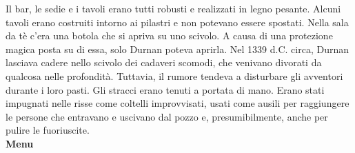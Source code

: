\documentclass{article}
\begin{document}
                    Il bar, le sedie e i tavoli erano tutti robusti e realizzati in legno pesante. Alcuni tavoli erano costruiti intorno ai pilastri e non potevano essere spostati.
                    Nella sala da tè c'era una botola che si apriva su uno scivolo. A causa di una protezione magica posta su di essa, solo Durnan poteva aprirla. Nel 1339 d.C. circa, Durnan lasciava cadere nello scivolo dei cadaveri scomodi, che venivano divorati da qualcosa nelle profondità. Tuttavia, il rumore tendeva a disturbare gli avventori durante i loro pasti.
                    Gli stracci erano tenuti a portata di mano. Erano stati impugnati nelle risse come coltelli improvvisati, usati come ausili per raggiungere le persone che entravano e uscivano dal pozzo e, presumibilmente, anche per pulire le fuoriuscite. \\
                    \textbf{Menu} \\ 
\end{document}
